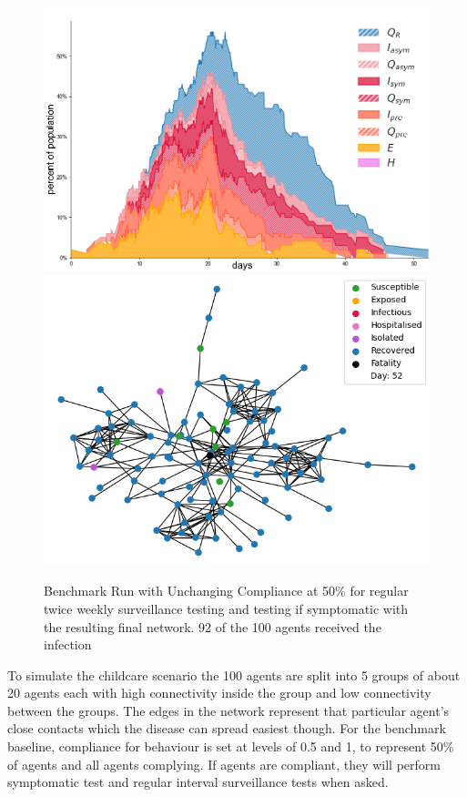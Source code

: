 \documentclass{article}
\begin{document}
\begin{figure}
\centering
\includegraphics[width=\textwidth]{Figure3}
\includegraphics[width=\textwidth]{Figure3Net}
\caption{Benchmark Run with Unchanging Compliance at 50\% for regular twice weekly surveillance testing and testing if symptomatic with the resulting final network. 92 of the 100 agents received the infection}
\end{figure}

\newpage 

To simulate the childcare scenario the 100 agents are split into 5 groups of about 20 agents each with high connectivity inside the group and low connectivity between the groups. The edges in the network represent that particular agent's close contacts which the disease can spread easiest though. For the benchmark baseline, compliance for behaviour is set at levels of 0.5 and 1, to represent 50\% of agents and all agents complying. If agents are compliant, they will perform symptomatic test and regular interval surveillance tests when asked.\newline
\end{document}
